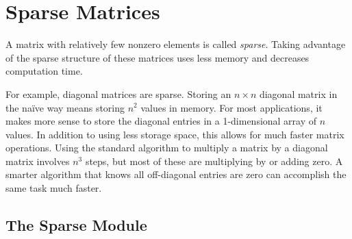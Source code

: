 \section*{Sparse Matrices} %

A matrix with relatively few nonzero elements is called \emph{sparse}.
Taking advantage of the sparse structure of these matrices uses less memory and decreases computation time.

For example, diagonal matrices are sparse.
Storing an $n \times n$ diagonal matrix in the na\"{i}ve way means storing $n^2$ values in memory.
For most applications, it makes more sense to store the diagonal entries in a 1-dimensional array of $n$ values.
In addition to using less storage space, this allows for much faster matrix operations.
Using the standard algorithm to multiply a matrix by a diagonal matrix involves $n^3$ steps, but most of these are multiplying by or adding zero.
A smarter algorithm that knows all off-diagonal entries are zero can accomplish the same task much faster.

\subsection*{The Sparse Module} %

